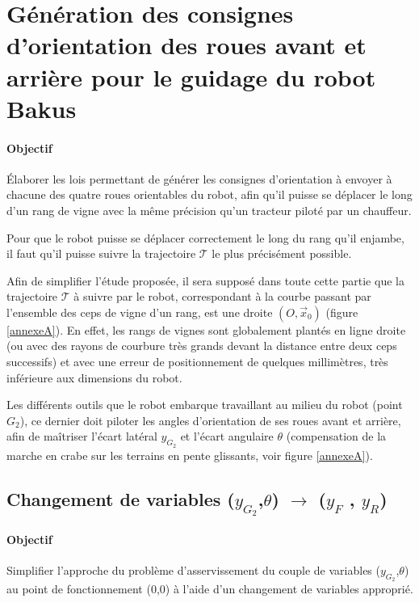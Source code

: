 \section{Génération des consignes d'orientation des roues avant et arrière
pour le guidage du robot Bakus}

\paragraph{Objectif}

Élaborer les lois permettant de générer les consignes d'orientation à envoyer à chacune des quatre roues orientables du robot, afin qu'il puisse se déplacer le long d'un rang de vigne avec la même précision qu'un tracteur piloté par un chauffeur.

Pour que le robot puisse se déplacer correctement le long du rang qu'il enjambe, il faut qu'il puisse suivre la trajectoire $\mathcal{T}$ le plus précisément possible.

Afin de simplifier l'étude proposée, il sera supposé dans toute cette partie que la trajectoire $\mathcal{T}$ à suivre par le robot, correspondant à la courbe passant par l'ensemble des ceps de vigne d'un rang, est une droite $(O,\vec{x}_0)$ (figure \ref{annexeA}). En effet, les rangs de vignes sont globalement plantés en ligne droite (ou avec des rayons de courbure très grands devant la distance entre deux ceps successifs) et avec une erreur de positionnement de quelques millimètres, très inférieure aux dimensions du robot.

Les différents outils que le robot embarque travaillant au milieu du robot (point $G_2$), ce dernier doit piloter les angles d'orientation de ses roues avant et arrière, afin de maîtriser l'écart latéral $y_{G_2}$ et l'écart angulaire $\theta$ (compensation de la marche en crabe sur les terrains en pente glissants, voir figure \ref{annexeA}).

\subsection{Changement de variables ($y_{G_2}$,$\theta$) $\rightarrow$ ($y_F$ , $y_R$)}

\paragraph{Objectif}

Simplifier l'approche du problème d'asservissement du couple de variables ($y_{G_2}$,$\theta$) au point de fonctionnement ($0$,$0$) à l'aide d'un changement de variables approprié.


